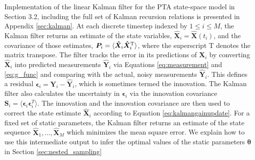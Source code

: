 \documentclass[fleqn,usenatbib,useAMS]{mnras}
\begin{document}
Implementation of the linear Kalman filter for the PTA state-space model in Section 3.2, including the full set of Kalman recursion relations is presented in Appendix \ref{sec:kalman}. At each discrete timestep indexed by $ 1 \leq i  \leq M$, the Kalman filter returns an estimate of the state variables, $\hat{\boldsymbol{X}}_i = \hat{\boldsymbol{X}}(t_i)$, and the covariance of those estimates, ${\boldsymbol{P}}_i = \langle {\boldsymbol{\hat X}}_i {\boldsymbol{\hat X}}_i^{\rm T} \rangle$, where the superscript T denotes the matrix transpose. The filter tracks the error in its predictions of $\boldsymbol{X}_i$ by converting ${\boldsymbol{\hat X}}_i$ into predicted measurements ${\boldsymbol{\hat Y}}_i$ via Equations \eqref{eq:measurement} and \eqref{eq:g_func} and comparing with the actual, noisy measurements ${\boldsymbol{\hat Y}}_i$. This defines a residual $\boldsymbol{\epsilon}_i = \boldsymbol{Y}_i  - \hat{\boldsymbol{Y}}_i$, which is sometimes termed the innovation. The Kalman filter also calculates the uncertainty in $\boldsymbol{\epsilon}_i$ via the innovation covariance $\boldsymbol{S}_i = \langle \boldsymbol{\epsilon}_i \boldsymbol{\epsilon}_i^{T} \rangle$. The innovation and the innovation covariance are then used to correct the state estimate ${\boldsymbol{\hat X}}_i$ according to Equation \eqref{eq:kalmangainupdate}. For a fixed set of static parameters, the Kalman filter returns an estimate of the state sequence ${\boldsymbol {\hat X}}_1, \dots , {\boldsymbol{\hat X}}_M$ which minimizes the mean square error. We explain how to use this intermediate output to infer the optimal values of the static parameters ${\boldsymbol{\theta}}$ in Section \ref{sec:nested_sampling} \newline 
\end{document}
